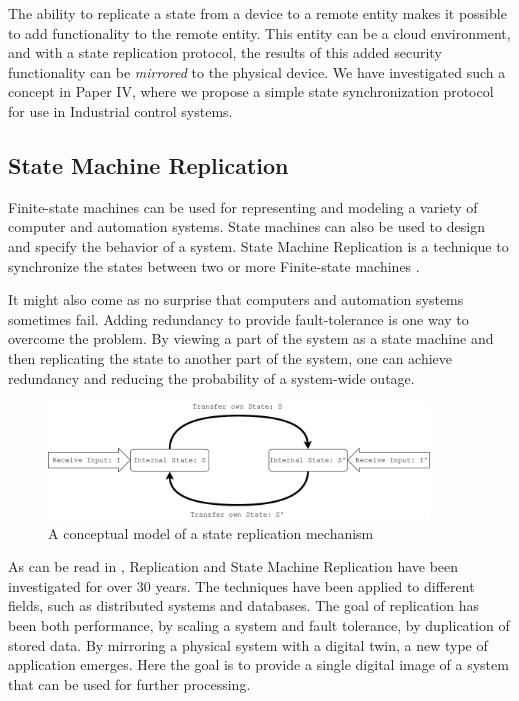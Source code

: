 The ability to replicate a state from a device to a remote entity makes it possible to add functionality to the remote entity. This entity can be a cloud environment, and with a state replication protocol, the results of this added security functionality can be \emph{mirrored} to the physical device. We have investigated such a concept in Paper IV, where we propose a simple state synchronization protocol for use in Industrial control systems.

\subsection{State Machine Replication}
Finite-state machines can be used for representing and modeling a variety of computer and automation systems. State machines can also be used to design and specify the behavior of a system. State Machine Replication is a technique to synchronize the states between two or more Finite-state machines \cite{lamport1984using}. 

It might also come as no surprise that computers and automation systems sometimes fail. Adding redundancy to provide fault-tolerance is one way to overcome the problem. By viewing a part of the system as a state machine and then replicating the state to another part of the system, one can achieve redundancy and reducing the probability of a system-wide outage. 


\begin{figure}[h]
\centering
\includegraphics[width=0.9\textwidth]{images/State_replication.pdf}
\caption{A conceptual model of a state replication mechanism}
\label{fig:state-replication}
\end{figure}

As can be read in \cite{charron2010replication}, Replication and State Machine Replication have been investigated for over 30 years. The techniques have been applied to different fields, such as distributed systems and databases. The goal of replication has been both performance, by scaling a system and fault tolerance, by duplication of stored data. By mirroring a physical system with a digital twin, a new type of application emerges. Here the goal is to provide a single digital image of a system that can be used for further processing.

